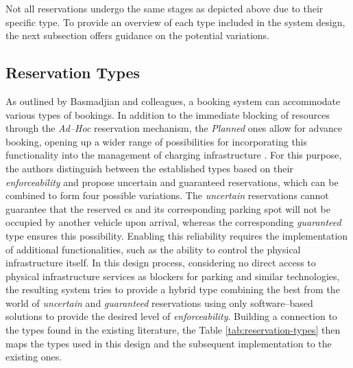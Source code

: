 \noindent Not all reservations undergo the same stages as depicted above due to their specific type. To provide an overview of each type included in the system design, the next subsection offers guidance on the potential variations.

\newpage

\subsection{Reservation Types}
\label{ch:Design:sec:Reservation:ssec:Reservation Types}

As outlined by Basmadjian and colleagues, a booking system can accommodate various types of bookings. In addition to the immediate blocking of resources through the \textit{Ad--Hoc} reservation mechanism, the \textit{Planned} ones allow for advance booking, opening up a wider range of possibilities for incorporating this functionality into the management of charging infrastructure \cite{basmadjian_reference_2020,basmadjian_interoperable_2019}.
For this purpose, the authors distinguish between the established types based on their \textit{enforceability} and propose uncertain and guaranteed reservations, which can be combined to form four possible variations.
The \textit{uncertain} reservations cannot guarantee that the reserved \acrshort{cs} and its corresponding parking spot will not be occupied by another vehicle upon arrival, whereas the corresponding \textit{guaranteed} type ensures this possibility.
Enabling this reliability requires the implementation of additional functionalities, such as the ability to control the physical infrastructure itself.
In this design process, considering no direct access to physical infrastructure services as blockers for parking and similar technologies, the resulting system tries to provide a hybrid type combining the best from the world of \textit{uncertain} and \textit{guaranteed} reservations using only software--based solutions to provide the desired level of \textit{enforceability}.
Building a connection to the types found in the existing literature, the Table \ref{tab:reservation-types} then maps the types used in this design and the subsequent implementation to the existing ones.

